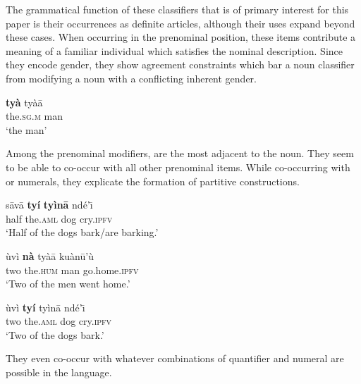 \documentclass[output=paper,modfonts,nonflat]{langsci/langscibook}
\begin{document}
The grammatical function of these classifiers that is of primary interest for this paper is their occurrences as definite articles, although their uses expand beyond these cases.  When occurring in the prenominal position, these items contribute a meaning of a familiar individual which satisfies the nominal description.  Since they encode gender, they show agreement constraints which bar a noun classifier from modifying a noun with a conflicting inherent gender.

\ea {}\label{ex:cisneros:44}
\gll
\textbf{ty\`a} ty\`a\=a\\
the.\textsc{sg.m} man\\
\glt
`the man'
\z 

\z 

Among the prenominal modifiers,  are the most adjacent to the noun.  They seem to be able to co-occur with all other prenominal items.  While co-occurring with  or numerals, they explicate the formation of partitive constructions.

\ea {}\label{ex:cisneros:46}
\gll
{\ob}s\=av\=a \textbf{ty\'i} \textbf{ty\`in\=a}{\cb} nd\'e'\=\i\\
{\db}half the.\textsc{aml} dog cry.\textsc{ipfv}\\
\glt
`Half of the dogs bark/are barking.'
\z 

\ea {}\label{ex:cisneros:47}
\gll
{\ob}\`uv\`i \textbf{n\`a} ty\`a\=a{\cb} ku\`an\=u'\`u\\
{\db}two the.\textsc{hum} man go.home.\textsc{ipfv}\\
\glt
`Two of the men went home.'
\z 

\ea {}\label{ex:cisneros:48}
\gll
{\ob}\`uv\`i \textbf{ty\'i} ty\`in\=a{\cb} nd\'e'\=\i\\
{\db}two the.\textsc{aml} dog cry.\textsc{ipfv}\\
\glt
`Two of the dogs bark.'
\z 

They even co-occur with whatever combinations of quantifier and numeral are possible in the language.

\z 
\end{document}
